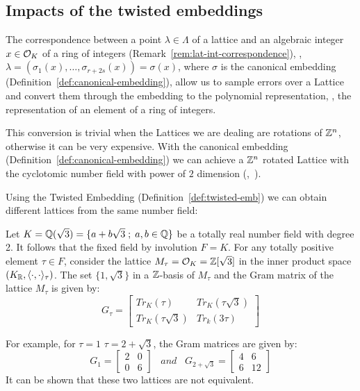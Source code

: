 \documentclass[a4paper,12pt]{article}
\begin{document}
\subsection{Impacts of the twisted embeddings}
\label{sec:org956960d}

\begin{text}
  The correspondence between a point $\lambda \in \Lambda$ of a lattice and an algebraic
  integer $x \in \mathcal{O}_K$ of a ring of integers (Remark~\ref{rem:lat-int-correspondence}),
  \ie, $\lambda = (\sigma_1(x), \dots, \sigma_{r+2s}(x)) = \sigma(x)$, where $\sigma$ is the
  canonical embedding (Definition~\ref{def:canonical-embedding}), allow us to
  sample errors over a Lattice and convert them through the embedding to the
  polynomial representation, \ie, the representation of an element of a ring of
  integers.

  This conversion is trivial when the Lattices we are dealing are rotations of
  $\mathbb{Z}^n$, otherwise it can be very expensive. With the canonical embedding
  (Definition~\ref{def:canonical-embedding}) we can achieve a $\mathbb{Z}^n$ rotated
  Lattice with the cyclotomic number field with power of $2$ dimension
  (\cite{Lyubashevsky2010},~\cite{DucasDurmos2012}).

  Using the Twisted Embedding (Definition~\ref{def:twisted-emb}) we can obtain
  different lattices from the same number field:

\end{text}

   \begin{example}
  Let $K = \mathbb{Q}(\sqrt{3}) = \{a + b\sqrt{3} \;;\; a,b \in \mathbb{Q}\}$ be a totally
  real number field with degree 2. It follows that the fixed field by
  involution $F=K$. For any totally positive element $\tau \in F$, consider
  the lattice $M_\tau = \mathcal{O}_K = \mathbb{Z}[\sqrt{3}]$ in the inner product space
  $(K_{\mathbb{R}},\langle \cdot,\cdot \rangle_\tau)$. The set $\{1,\sqrt{3}\}$ in a
  $\mathbb{Z}$-basis of $M_\tau$ and the Gram matrix of the lattice $M_\tau$ is given by:
  \[G_\tau =
    \begin{bmatrix}
      Tr_K(\tau) & Tr_K(\tau\sqrt{3}) \\
      Tr_K(\tau\sqrt{3}) & Tr_k(3\tau)
    \end{bmatrix}
  \]

  For example, for $\tau = 1$  $\tau = 2 + \sqrt{3}$, the Gram matrices are
  given by:
  \[
    G_1 =
    \begin{bmatrix}
      2 & 0 \\
      0 & 6
    \end{bmatrix}
    \;\;\;and\;\;\;
    G_{2+\sqrt{3}} =
    \begin{bmatrix}
      4 & 6 \\
      6 & 12
    \end{bmatrix}
  \]
  It can be shown that these two lattices are not equivalent.
\end{example}
\end{document}
